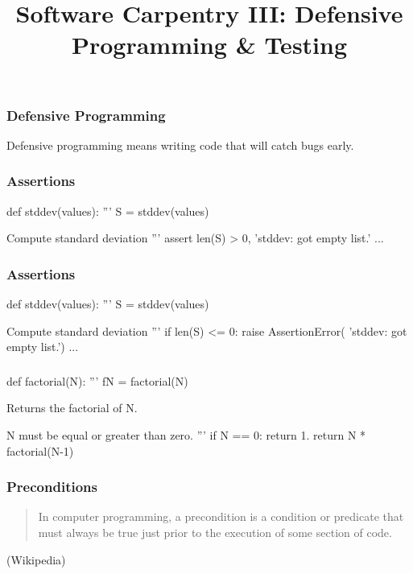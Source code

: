 
\title{Software Carpentry III: Defensive Programming \& Testing}

\frame{\maketitle}

\begin{frame}[fragile]
\frametitle{Defensive Programming}

Defensive programming means writing code that will catch bugs early.
\end{frame}

\begin{frame}[fragile]
\frametitle{Assertions}
\begin{python}
def stddev(values):
    '''
    S = stddev(values)

    Compute standard deviation
    '''
    assert len(S) > 0, 'stddev: got empty list.'
    ...
\end{python}
\end{frame}

\begin{frame}[fragile]
\frametitle{Assertions}

\begin{python}
def stddev(values):
    '''
    S = stddev(values)

    Compute standard deviation
    '''
    if len(S) <= 0:
        raise AssertionError(
            'stddev: got empty list.')
    ...
\end{python}

\end{frame}

\begin{frame}[fragile]
\frametitle{}

\begin{python}
def factorial(N):
    '''
    fN = factorial(N)

    Returns the factorial of N.

    N must be equal or greater than zero.
    '''
    if N == 0:
        return 1.
    return N * factorial(N-1)
\end{python}
\end{frame}

\begin{frame}[fragile]
\frametitle{Preconditions}

\begin{quote}
In computer programming, a precondition is a condition or predicate that must always be true just prior to the execution of some section of code.
\end{quote}

\begin{flushright}
(Wikipedia)
\end{flushright}

\end{frame}

